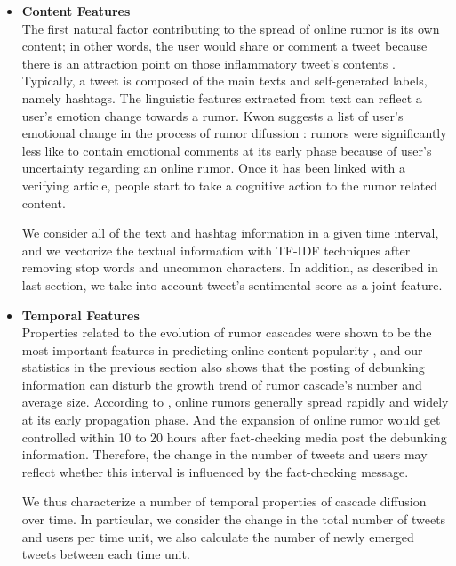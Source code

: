 \documentclass[conference]{IEEEtran}
\begin{document}
	\begin{itemize}
		\item \textbf{Content Features}\\
		The first natural factor contributing to the spread of online rumor is its own content; in other words, the user would share or comment a tweet because there is an attraction point on those inflammatory tweet's contents \cite{cheng2014can, kumar2018false}. Typically, a tweet is composed of the main texts and self-generated labels, namely hashtags. The linguistic features extracted from text can reflect a user's emotion change towards a rumor. Kwon suggests a list of user's emotional change in the process of rumor difussion \cite{kwon2013prominent}: rumors were significantly less like to contain emotional comments at its early phase because of user's uncertainty regarding an online rumor. Once it has been linked with a verifying article, people start to take a cognitive action to the rumor related content. 
		
		We consider all of the text and hashtag information in a given time interval, and we vectorize the textual information with TF-IDF techniques after removing stop words and uncommon characters. In addition, as described in last section, we take into account tweet's sentimental score as a joint feature. \\
		
		\item \textbf{Temporal Features}\\
		Properties related to the evolution of rumor cascades were shown to be the most important features in predicting online content popularity \cite{ma2013predicting}, and our statistics in the previous section also shows that the posting of debunking information can disturb the growth trend of rumor cascade's number and average size. According to \cite{vosoughi2018spread, kumar2018false, shao2016hoaxy}, online rumors generally spread rapidly and widely at its early propagation phase. And the expansion of online rumor would get controlled within 10 to 20 hours after fact-checking media post the debunking information. Therefore, the change in the number of tweets and users may reflect whether this interval is influenced by the fact-checking message.
		
		We thus characterize a number of temporal properties of cascade diffusion over time. In particular, we consider the change in the total number of tweets and users per time unit, we also calculate the number of newly emerged tweets between each time unit. 
		\\
		
	\end{itemize}
	
\end{document}
